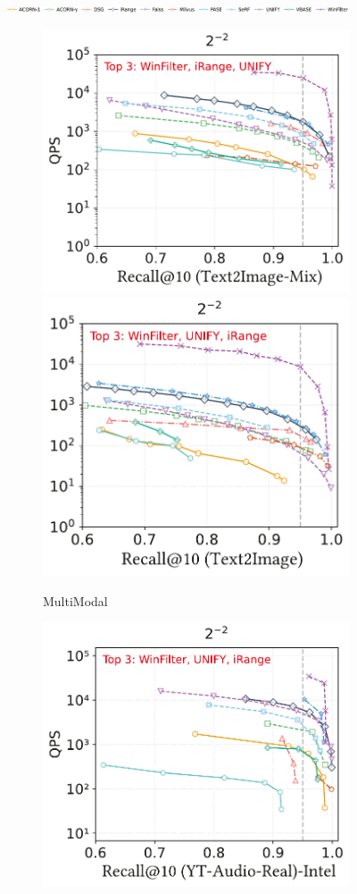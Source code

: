 \documentclass[sigconf, nonacm]{acmart}
\begin{document}
\begin{figure}[t]
	\centering
	
	\includegraphics[width=0.9\textwidth]{figures/exp/range_legend.pdf}
	
	
	\begin{subfigure}[b]{0.39\textwidth}
		\centering
		\includegraphics[width=0.495\linewidth]{figures/exp/range_multimodel.pdf}
		\hfill 
		\includegraphics[width=0.47\linewidth]{figures/exp/range_multimodel_1.pdf}
		\caption{MultiModal}
		\label{fig:range-multimodal} 
	\end{subfigure}
	\hfill %
	\begin{subfigure}[b]{0.39\textwidth}
		\centering
		\includegraphics[width=0.495\linewidth]{figures/exp/range_85.pdf}

\end{subfigure}
\end{figure}
\end{document}
